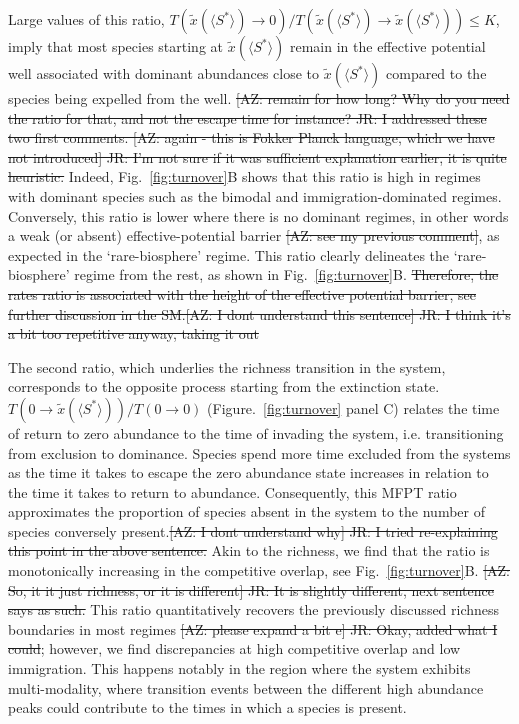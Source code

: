\documentclass[9pt,twocolumn,twoside,lineno]{pnas-new}
\begin{document}
Large values of this ratio, $T(\tilde{x}(\langle S^* \rangle )\rightarrow 0)/ T(\tilde{x}(\langle S^* \rangle )\rightarrow \tilde{x}(\langle S^* \rangle )) \leq K$, imply that most species starting at $\tilde{x}(\langle S^* \rangle )$ remain in the effective potential well associated with dominant abundances close to $\tilde{x}(\langle S^* \rangle )$ compared to the species being expelled from the well.
\st{[AZ: remain for how long? Why do you need the ratio for that, and not the escape time for instance? JR: I addressed these two first comments. [AZ: again - this is Fokker Planck language, which we have not introduced] JR: I'm not sure if it was sufficient explanation earlier, it is quite heuristic.}
Indeed, Fig.~\ref{fig:turnover}B shows that this ratio is high in regimes with dominant species such as the bimodal and immigration-dominated regimes.
Conversely, this ratio is lower where there is no dominant regimes, in other words a weak (or absent) effective-potential barrier \st{[AZ: see my previous comment]}, as expected in the `rare-biosphere' regime. 
This ratio clearly delineates the  `rare-biosphere' regime from the rest, as shown in Fig.~\ref{fig:turnover}B. %
\st{Therefore, the rates ratio is associated with the height of the effective potential barrier, see further discussion in the SM.[AZ: I dont understand this sentence] JR: I think it's a bit too repetitive anyway, taking it out}

The second ratio, which underlies the richness transition in the system, corresponds to the opposite process starting from the extinction state.
$T(0\rightarrow \tilde{x}(\langle S^* \rangle ))/T(0\rightarrow0)$ (Figure.~\ref{fig:turnover} panel C) relates the time of return to zero abundance to the time of invading the system, i.e. transitioning from exclusion to dominance. 
Species spend more time excluded from the systems as the time it takes to escape the zero abundance state increases in relation to the time it takes to return to abundance.
Consequently, this MFPT ratio approximates the proportion of species absent in the system to the number of species conversely present.\st{[AZ: I dont understand why] JR: I tried re-explaining this point in the above sentence.}
Akin to the richness, we find that the ratio is monotonically increasing in the competitive overlap, see Fig.~\ref{fig:turnover}B. \st{[AZ: So, it it just richness, or it is different] JR: It is slightly different, next sentence says as such.}
This ratio quantitatively recovers the previously discussed richness boundaries in most regimes \st{[AZ: please expand a bit e] JR: Okay, added what I could}; however, we find discrepancies at high competitive overlap and low immigration.
This happens notably in the region where the system exhibits multi-modality, where transition events between the different high abundance peaks could contribute to the times in which a species is present.
\end{document}
